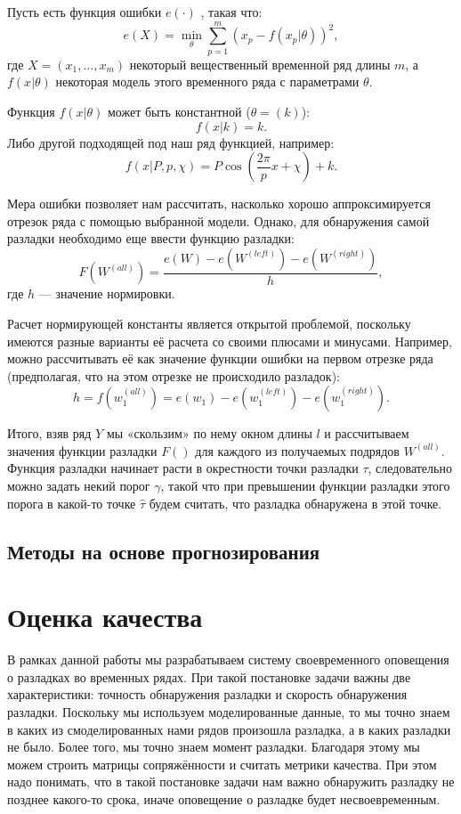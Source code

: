 \documentclass[%
12pt,
master,  %
natbib,      %
subf,        %
substylefile = spbu.rtx,
href,        %
colorlinks,  %
]{disser}
\begin{document}
Пусть есть функция ошибки $e(\cdot)$ , такая что:
$$e(X) = \min_{\theta}{\sum_{p=1}^m(x_p - f(x_p | \theta))^2 },$$
где $X = (x_1, \dots, x_m)$ некоторый вещественный временной ряд длины $m$, а $f(x | \theta)$ некоторая модель этого временного ряда с параметрами $\theta$.

Функция $f(x|\theta)$ может быть константной ($\theta = (k)$):
$$ f(x | k) = k. $$
Либо другой подходящей под наш ряд функцией, например:
$$ f(x | P, p, \chi) = P\cos(\frac{2\pi}{p}x + \chi) + k. $$

Мера ошибки позволяет нам рассчитать, насколько хорошо аппроксимируется отрезок ряда с помощью выбранной модели. Однако, для обнаружения самой разладки необходимо еще ввести функцию разладки:
$$ F(W^{(all)}) = \frac{e(W) - e(W^{(left)}) - e(W^{(right)})}{h}, $$
где $h$ --- значение нормировки.


Расчет нормирующей константы является открытой проблемой, поскольку имеются разные варианты её расчета со своими плюсами и минусами.
Например, можно рассчитывать её как значение функции ошибки на первом отрезке ряда (предполагая, что на этом отрезке не происходило разладок):
$$ h = f(w_1^{(all)}) = e(w_1) - e(w_1^{(left)}) - e(w_1^{(right)}). $$

Итого, взяв ряд $Y$ мы «скользим» по нему окном длины $l$ и рассчитываем значения функции разладки $F()$ для каждого из получаемых подрядов $W^{(all)}$. Функция разладки начинает расти в окрестности точки разладки $\tau$, следовательно можно задать некий порог $\gamma$, такой что при превышении функции разладки этого порога в какой-то точке $\hat{\tau}$ будем считать, что разладка обнаружена в этой точке.

\subsection{Методы на основе прогнозирования}

\section{Оценка качества}

В рамках данной работы мы разрабатываем систему своевременного оповещения о разладках во временных рядах. При такой постановке задачи важны две характеристики: точность обнаружения разладки и скорость обнаружения разладки. Поскольку мы используем моделированные данные, то мы точно знаем в каких из смоделированных нами рядов произошла разладка, а в каких разладки не было. Более того, мы точно знаем момент разладки. Благодаря этому мы можем строить матрицы сопряжённости и считать метрики качества. При этом надо понимать, что в такой постановке задачи нам важно обнаружить разладку не позднее какого-то срока, иначе оповещение о разладке будет несвоевременным. 
\end{document}
